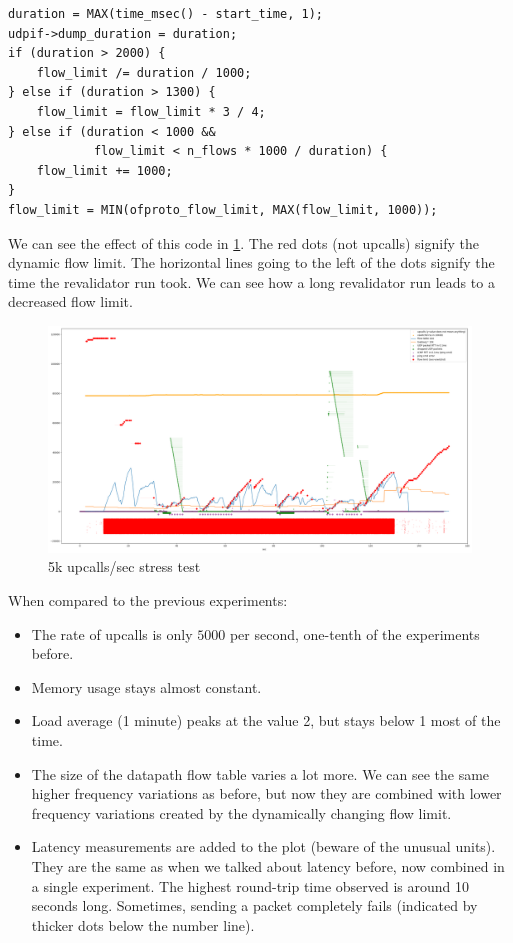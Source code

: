 \begin{verbatim}
duration = MAX(time_msec() - start_time, 1);
udpif->dump_duration = duration;
if (duration > 2000) {
    flow_limit /= duration / 1000;
} else if (duration > 1300) {
    flow_limit = flow_limit * 3 / 4;
} else if (duration < 1000 &&
            flow_limit < n_flows * 1000 / duration) {
    flow_limit += 1000;
}
flow_limit = MIN(ofproto_flow_limit, MAX(flow_limit, 1000));
\end{verbatim}

We can see the effect of this code in \cref{fig:packet-flood-limited}. The red dots (not upcalls) signify the dynamic flow limit. The horizontal lines going to the left of the dots signify the time the revalidator run took. We can see how a long revalidator run leads to a decreased flow limit.

\begin{figure}
    \centering
    \includegraphics[width=.9\linewidth]{img/packet_flood_limited_resources_50k.png}
    \caption{5k upcalls/sec stress test}
    \label{fig:packet-flood-limited}
\end{figure}

 When compared to the previous experiments:

\begin{itemize}
    \item The rate of upcalls is only $5000$ per second, one-tenth of the experiments before.
    \item Memory usage stays almost constant.
    \item Load average (1 minute) peaks at the value 2, but stays below 1 most of the time.
    \item The size of the datapath flow table varies a lot more. We can see the same higher frequency variations as before, but now they are combined with lower frequency variations created by the dynamically changing flow limit.
    \item Latency measurements are added to the plot (beware of the unusual units). They are the same as when we talked about latency before, now combined in a single experiment. The highest round-trip time observed is around 10 seconds long. Sometimes, sending a packet completely fails (indicated by thicker dots below the number line).
\end{itemize}

